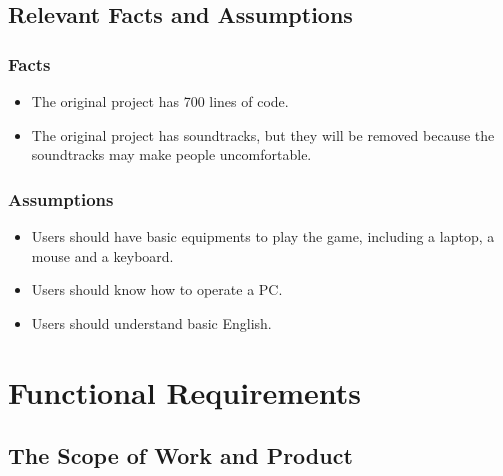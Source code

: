 \documentclass[12pt]{article}
\begin{document}
\subsection{Relevant Facts and Assumptions}
\subsubsection{Facts}
\begin{itemize}
\item The original project has 700 lines of code.
\item The original project has soundtracks, but they will be removed because the soundtracks may make people uncomfortable.
\end{itemize}
\subsubsection{Assumptions}
\begin{itemize}
\item Users should have basic equipments to play the game,
including a laptop, a mouse and a keyboard.
\item Users should know how to operate a PC.
\item Users should understand basic English.
\end{itemize}
\newpage
\section{Functional Requirements}
\subsection{The Scope of Work and Product}
\end{document}

